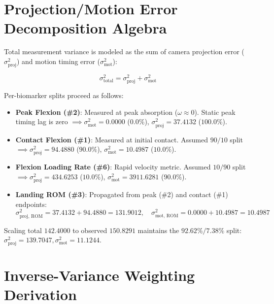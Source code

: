 \section{Projection/Motion Error Decomposition Algebra}
\label{sec:a-2-projection-motion-error-decomposition-algebra}


Total measurement variance is modeled as the sum of camera projection error ($\sigma^2_{\text{proj}}$) and motion timing error ($\sigma^2_{\text{mot}}$):

\begin{equation}
  \sigma^2_{\text{total}} = \sigma^2_{\text{proj}} + \sigma^2_{\text{mot}}
  \label{eq:disp2}
\end{equation}

Per-biomarker splits proceed as follows:

\begin{itemize}
  \item \textbf{Peak Flexion (\protect\#2)}: Measured at peak absorption ($\omega \approx 0$). Static peak timing lag is zero $\implies \sigma^2_{\text{mot}} = 0.0000$ ($0.0\%$), $\sigma^2_{\text{proj}} = 37.4132$ ($100.0\%$).
  \item \textbf{Contact Flexion (\protect\#1)}: Measured at initial contact. Assumed $90/10$ split $\implies \sigma^2_{\text{proj}} = 94.4880$ ($90.0\%$), $\sigma^2_{\text{mot}} = 10.4987$ ($10.0\%$).
  \item \textbf{Flexion Loading Rate (\protect\#6)}: Rapid velocity metric. Assumed $10/90$ split $\implies \sigma^2_{\text{proj}} = 434.6253$ ($10.0\%$), $\sigma^2_{\text{mot}} = 3911.6281$ ($90.0\%$).
  \item \textbf{Landing ROM (\protect\#3)}: Propagated from peak (\protect\#2) and contact (\protect\#1) endpoints:
\begin{equation}
  \sigma^2_{\text{proj, ROM}} = 37.4132 + 94.4880 = 131.9012, \quad \sigma^2_{\text{mot, ROM}} = 0.0000 + 10.4987 = 10.4987
  \label{eq:disp3}
\end{equation}
\end{itemize}
Scaling total $142.4000$ to observed $150.8291$ maintains the $92.62\% / 7.38\%$ split: $\sigma^2_{\text{proj}} = 139.7047, \sigma^2_{\text{mot}} = 11.1244$.



\section{Inverse-Variance Weighting Derivation}
\label{sec:a-3-inverse-variance-weighting-derivation}


